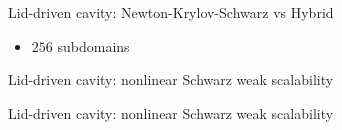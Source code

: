 \begin{frame}{Lid-driven cavity: Newton-Krylov-Schwarz vs Hybrid}
	\begin{itemize}
		\item $256$ subdomains
	\end{itemize}
	\begin{figure}
		\centering
		
		\label{fig:residual-ldc}
	\end{figure}
\end{frame}

\begin{frame}{Lid-driven cavity: nonlinear Schwarz weak scalability}
	\begin{figure}
		\centering
		
		\label{fig:weak-scalability-nls}
	\end{figure}
\end{frame}

\begin{frame}{Lid-driven cavity: nonlinear Schwarz weak scalability}
	\begin{figure}
		\centering
		
		\label{fig:weak-scalability-per-iter-nls}
	\end{figure}
\end{frame}

